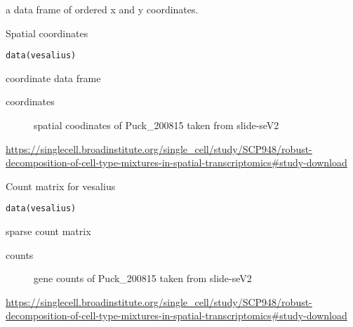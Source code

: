 \documentclass[a4paper]{book}
\begin{document}
%
\begin{Value}
a data frame of ordered x and y coordinates.
\end{Value}
%
\begin{Description}
Spatial coordinates
\end{Description}
%
\begin{Usage}
\begin{verbatim}
data(vesalius)
\end{verbatim}
\end{Usage}
%
\begin{Format}
coordinate data frame
\begin{description}

\item[coordinates] spatial coodinates of Puck\_200815 taken from slide-seV2

\end{description}

\end{Format}
%
\begin{Source}
\url{https://singlecell.broadinstitute.org/single_cell/study/SCP948/robust-decomposition-of-cell-type-mixtures-in-spatial-transcriptomics\#study-download}
\end{Source}
%
\begin{Description}
Count matrix for vesalius
\end{Description}
%
\begin{Usage}
\begin{verbatim}
data(vesalius)
\end{verbatim}
\end{Usage}
%
\begin{Format}
sparse count matrix
\begin{description}

\item[counts] gene counts of Puck\_200815 taken from slide-seV2

\end{description}

\end{Format}
%
\begin{Source}
\url{https://singlecell.broadinstitute.org/single_cell/study/SCP948/robust-decomposition-of-cell-type-mixtures-in-spatial-transcriptomics\#study-download}
\end{Source}
\end{document}
